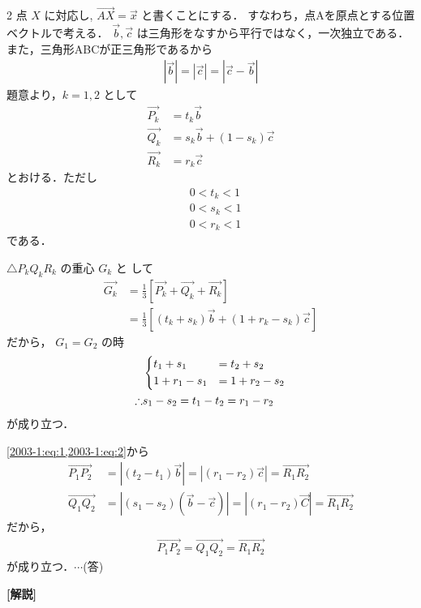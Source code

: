 \documentclass[../../../../main.tex]{subfiles}
\begin{document}
\begin{multicols}{2}
    点 $X$ に対応し, $\vec{AX} = \vec{x}$ と書くことにする．
    すなわち，点Aを原点とする位置ベクトルで考える．
    $\vec{b}, \vec{c}$ は三角形をなすから平行ではなく，一次独立である．
    また，三角形ABCが正三角形であるから
    \begin{align}
        |\vec{b}| = |\vec{c}| = |\vec{c}-\vec{b}| \label{2003-1:eq:1}
    \end{align}
    題意より，$k=1,2$ として
    \begin{align*}
        \vec{P_k} & = t_k \vec{b}                   \\
        \vec{Q_k} & = s_k \vec{b} + (1-s_k) \vec{c} \\
        \vec{R_k} & = r_k \vec{c}
    \end{align*}
    とおける．ただし
    \begin{align*}
         & 0 < t_k < 1 \\
         & 0 < s_k < 1 \\
         & 0 < r_k < 1
    \end{align*}
    である．

    $\triangle P_k Q_k R_k$ の重心 $G_k$ と して
    \begin{align*}
        \vec{G_k}
         & = \frac{1}{3} \left[\vec{P_k}+\vec{Q_k}+\vec{R_k}\right]             \\
         & = \frac{1}{3} \left[ (t_k+s_k) \vec{b} + (1+r_k-s_k) \vec{c} \right]
    \end{align*}
    だから， $G_1 = G_2$ の時
    \begin{align}
         & \begin{dcases}
               t_1+s_1   & = t_2+s_2   \\
               1+r_1-s_1 & = 1+r_2-s_2
           \end{dcases}                          \\
        \therefore
         & s_1-s_2  = t_1-t_2 = r_1-r_2 \label{2003-1:eq:2}
    \end{align}
    が成り立つ．

    \cref{2003-1:eq:1,2003-1:eq:2}から
    \begin{align*}
        \vec{P_1 P_2} & = |(t_2-t_1) \vec{b}| = |(r_1-r_2) \vec{c}| = \vec{R_1 R_2}         \\
        \vec{Q_1 Q_2} & = |(s_1-s_2)(\vec{b}-\vec{c})| = |(r_1-r_2)\vec{C}| = \vec{R_1 R_2}
    \end{align*}
    だから，
    \begin{align*}
        \vec{P_1 P_2} = \vec{Q_1 Q_2} = \vec{R_1 R_2}
    \end{align*}
    が成り立つ．$\cdots$(答)


    \vspace{10pt}
    {\bf[解説]}

    \newpage
\end{multicols}
\end{document}
